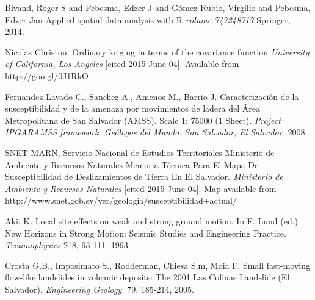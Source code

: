 \documentclass[11pt,twoside]{rmta2010eng}%
\begin{document}
\begin{thebibliography}{99}
Bivand, Roger S and Pebesma, Edzer J and G{\'o}mez-Rubio, Virgilio and Pebesma, Edzer Jan
\newblock Applied spatial data analysis with R
\newblock \emph{volume 747248717}
 Springer, 2014.



Nicolas Christou.
\newblock Ordinary kriging in terms of the covariance function
\newblock \emph{University of California, Los Angeles}
 [cited 2015 June 04]. Available from http://goo.gl/0J1RkO



Fernandez-Lavado C., Sanchez A., Amenos M., Barrio J.
\newblock Caracterizaci\'{o}n de la susceptibilidad y de la amenaza por movimientos de ladera del \'{A}rea Metropolitana de San Salvador (AMSS). Scale 1: 75000 (1 Sheet).
\newblock \emph{Project IPGARAMSS framework. Ge\'{o}logos del Mundo. San Salvador, El Salvador.}
 2008.




SNET-MARN, Servicio Nacional de Estudios Territoriales-Ministerio de Ambiente y Recursos Naturales
\newblock Memoria T\'{e}cnica Para El Mapa De Susceptibilidad de Deslizamientos de Tierra En El Salvador.
\newblock \emph{Ministerio de Ambiente y Recursos Naturales}
 [cited 2015 June 04]. Map available from http://www.snet.gob.sv/ver/geologia/susceptibilidad+actual/


Aki, K. 
\newblock Local site effects on weak and strong ground motion. In F. Lund (ed.) New Horizons in Strong Motion: Seismic Studies and Engineering Practice.
\newblock \emph{Tectonophysics}
 218, 93-111, 1993.   


Crosta G.B., Imposimato S., Rodderman, Chiesa S.m, Moia F. 
\newblock Small fast-moving flow-like landslides in volcanic deposits: The 2001 Las Colinas Landslide (El Salvador). 
\newblock \emph{Engineering Geology.}
 79, 185-214, 2005.




\end{thebibliography}
\end{document}
